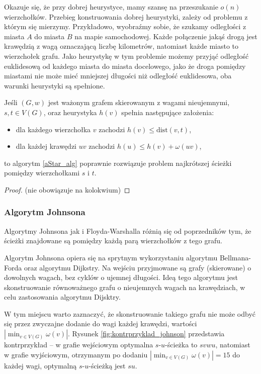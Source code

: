 Okazuje się, że przy dobrej heurystyce, mamy szansę na 
przeszukanie $o(n)$ wierzchołków. Przebieg konstruowania
dobrej heurystyki, zależy od problemu z którym się mierzymy. 
Przykładowo, wyobraźmy sobie, że szukamy odległości z miasta $A$
do miasta $B$ na mapie samochodowej. Każde połączenie jakąś drogą
jest krawędzią z wagą oznaczającą liczbę kilometrów, natomiast
każde miasto to wierzchołek grafu. Jako heurystykę w tym problemie 
możemy przyjąć odległość euklidesową od każdego miasta
do miasta docelowego, jako że droga pomiędzy miastami nie może mieć 
mniejszej długości niż odległość euklidesowa, oba warunki
heurystyki są spełnione.

\begin{theorem}
	 Jeśli
	$(G, w)$ jest ważonym grafem skierowanym
	z wagami nieujemnymi,
	$s,t \in V(G)$, oraz heurystyka $h(v)$
	spełnia następujące założenia:
	\begin{itemize}
		\item dla każdego wierzchołka $v$ zachodzi $h(v) \leq \text{dist}(v, t)$,
		\item dla każdej krawędzi $uv$ zachodzi $h(u) \leq h(v) + \omega(uv)$,
	\end{itemize}
	to algorytm \ref{aStar_alg}
	poprawnie rozwiązuje problem najkrótszej ścieżki
	pomiędzy wierzchołkami $s$ i $t$.
	\begin{proof}
		(nie obowiązuje na kolokwium)
	\end{proof}
	\label{aStar_proof}
\end{theorem}

\subsubsection{Algorytm Johnsona}
Algorytmy Johnsona jak i Floyda-Warshalla 
różnią się od poprzedników tym, że
ścieżki znajdowane są pomiędzy każdą parą
wierzchołków z tego grafu.

Algorytm Johnsona opiera się na sprytnym wykorzystaniu
algorytmu Bellmana-Forda oraz algorytmu Dijkstry. Na 
wejściu przyjmowane są grafy (skierowane) o dowolnych
wagach, bez cyklów o ujemnej długości. Ideą tego
algorytmu jest skonstruowanie równoważnego 
grafu o nieujemnych wagach na krawędziach,
w celu zastosowania algorytmu Dijsktry.

W tym miejscu warto zaznaczyć, że skonstruowanie takiego
grafu nie może odbyć się przez zwyczajne dodanie
do wagi każdej krawędzi, wartości $|\!\min_{v \in V(G)}{\omega(v)}|$. 
Rysunek \ref{fig:kontrprzyklad_johnson}
przedstawia kontrprzykład -- w grafie wejściowym
optymalna $s$-$u$-ścieżka to $svwu$, natomiast
w grafie wyjściowym, otrzymanym po dodaniu
$|\!\min_{v \in V(G)}{\omega(v)}| = 15$ do każdej 
wagi, optymalną $s$-$u$-ścieżką jest $su$.

